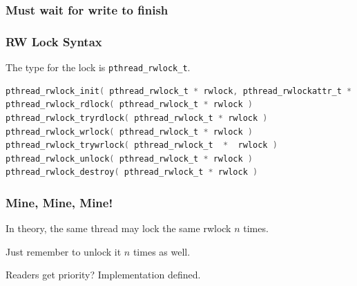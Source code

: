 \begin{frame}
  \frametitle{Must wait for write to finish}

  \begin{center}
    
  \end{center}
\end{frame}




\begin{frame}[fragile]
\frametitle{RW Lock Syntax}

The type for the lock is \texttt{pthread\_rwlock\_t}. 


\begin{lstlisting}[language=C]
pthread_rwlock_init( pthread_rwlock_t * rwlock, pthread_rwlockattr_t * attr )
pthread_rwlock_rdlock( pthread_rwlock_t * rwlock )
pthread_rwlock_tryrdlock( pthread_rwlock_t * rwlock )
pthread_rwlock_wrlock( pthread_rwlock_t * rwlock )
pthread_rwlock_trywrlock( pthread_rwlock_t  *  rwlock )
pthread_rwlock_unlock( pthread_rwlock_t * rwlock )
pthread_rwlock_destroy( pthread_rwlock_t * rwlock )
\end{lstlisting}



\end{frame}


\begin{frame}
\frametitle{Mine, Mine, Mine!}

In theory, the same thread may lock the same rwlock $n$ times.

Just remember to unlock it $n$ times as well.

Readers get priority? Implementation defined.

\end{frame}


